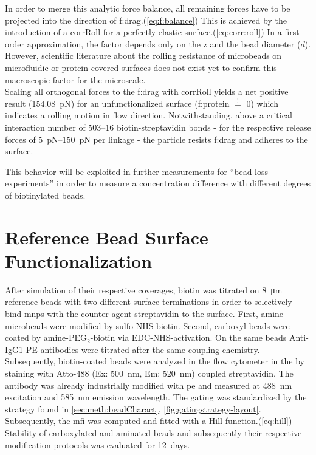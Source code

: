 In order to merge this analytic force balance, all remaining forces have to be projected into the direction of \acrfull{f:drag}.(\cref{eq:f:balance}) This is achieved by the introduction of a \gls{corrRoll} for a perfectly elastic surface.(\cref{eq:corr:roll}) In a first order approximation, the factor depends only on the \acrfull{z} and the bead diameter ($d$). However, scientific literature about the rolling resistance of microbeads on microfluidic or protein covered surfaces does not exist yet to confirm this macroscopic factor for the microscale. \\
Scaling all orthogonal forces to the \acrlong{f:drag} with \gls{corrRoll} yields a net positive result (\SI{154.08}{\pico\newton}) for an unfunctionalized surface (\gls{f:protein} $\overset{!}{=}$ \num{0}) which indicates a rolling motion in flow direction. Notwithstanding, above a critical interaction number of \numrange{503}{16} biotin-streptavidin bonds - for the respective release forces of \SIrange{5}{150}{\pico\newton} per linkage - the particle resists \acrlong{f:drag} and adheres to the surface.

This behavior will be exploited in further measurements for ``bead loss experiments'' in order to measure a concentration difference with different degrees of biotinylated beads.


\clearpage
\section{Reference Bead Surface Functionalization}
After simulation of their respective coverages, biotin was titrated on \SI{8}{\micro\meter} reference beads with two different surface terminations in order to selectively bind \glspl{mnp} with the counter-agent streptavidin to the surface. First, \gls{amine}-microbeads were modified by sulfo-NHS-biotin. Second, \gls{carboxyl}-beads were coated by amine-PEG$_2$-biotin via EDC-NHS-activation. On the same beads Anti-IgG1-PE antibodies were titrated after the same coupling chemistry.\\
Subsequently, biotin-coated beads were analyzed in the flow cytometer in the by staining with Atto-488 (Ex: \SI{500}{\nano\meter}, Em: \SI{520}{\nano\meter}) coupled streptavidin. The antibody was already industrially modified with \gls{pe} and measured at \SI{488}{\nano\meter} excitation and \SI{585}{\nano\meter}  emission wavelength. The gating was standardized by the strategy found in \cref{sec:meth:beadCharact}, \cref{fig:gatingstrategy-layout}. Subsequently, the \gls{mfi} was computed and fitted with a Hill-function.(\cref{eq:hill}) Stability of carboxylated and aminated beads and subsequently their respective modification protocols was evaluated for \SI{12}{days}.


